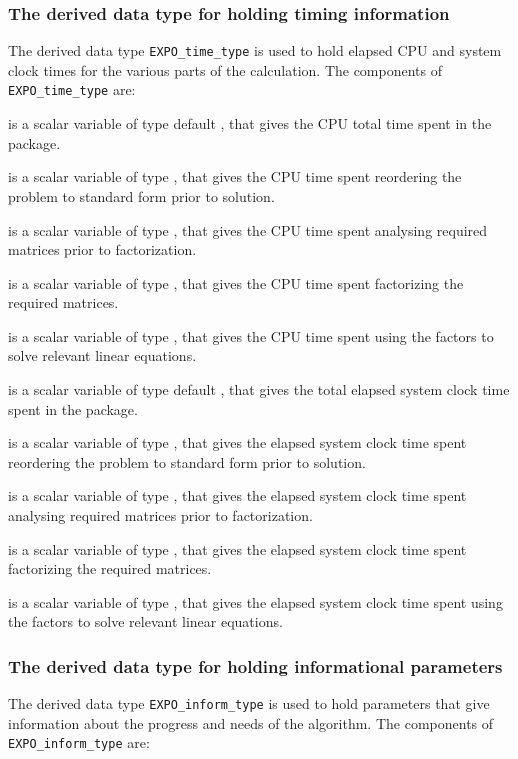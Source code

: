 \documentclass{galahad}
\newcommand{\packagename}{EXPO}
\begin{document}

\subsubsection{The derived data type for holding timing
 information}\label{typetime}
The derived data type
{\tt \packagename\_time\_type}
is used to hold elapsed CPU and system clock times for the various parts
of the calculation. The components of
{\tt \packagename\_time\_type}
are:
\begin{description}
 is a scalar variable of type default \real, that gives
 the CPU total time spent in the package.

 is a scalar variable of type \realdp, that gives
 the CPU time spent reordering the problem to standard form prior to solution.

 is a scalar variable of type \realdp, that gives
 the CPU time spent analysing required matrices prior to factorization.

 is a scalar variable of type \realdp, that gives
 the CPU time spent factorizing the required matrices.

 is a scalar variable of type \realdp, that gives
 the CPU time spent using the factors to solve relevant linear equations.

 is a scalar variable of type default \real, that gives
 the total elapsed system clock time spent in the package.

 is a scalar variable of type \realdp, that gives
 the elapsed system clock time spent reordering the problem to standard form
prior to solution.

 is a scalar variable of type \realdp, that gives
 the  elapsed system clock time spent analysing required matrices prior to
factorization.

 is a scalar variable of type \realdp, that gives
 the  elapsed system clock time spent factorizing the required matrices.

 is a scalar variable of type \realdp, that gives
 the  elapsed system clock time spent using the factors to solve relevant
linear equations.

\end{description}


\subsubsection{The derived data type for holding informational
 parameters}\label{typeinform}
The derived data type
{\tt \packagename\_inform\_type}
is used to hold parameters that give information about the progress and needs
of the algorithm. The components of
{\tt \packagename\_inform\_type}
are:
\end{document}
